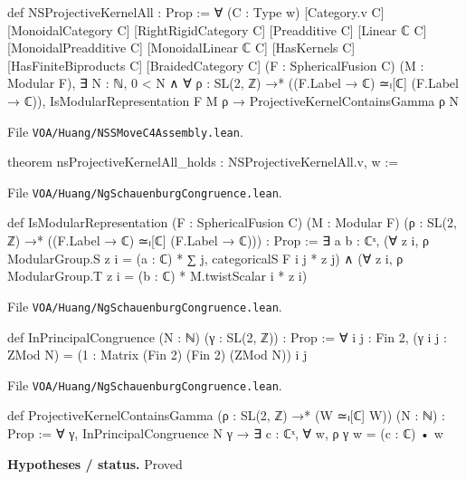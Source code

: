 \documentclass[11pt,openany]{book}
\newcommand{\leanpath}[1]{\texttt{\small #1}}
\theoremstyle{definition}
\theoremstyle{plain}
\begin{document}
\begin{leancode}
def NSProjectiveKernelAll : Prop :=
  ∀ (C : Type w) [Category.{v} C] [MonoidalCategory C] [RightRigidCategory C]
    [Preadditive C] [Linear ℂ C] [MonoidalPreadditive C] [MonoidalLinear ℂ C]
    [HasKernels C] [HasFiniteBiproducts C] [BraidedCategory C]
    (F : SphericalFusion C) (M : Modular F),
    ∃ N : ℕ, 0 < N ∧ ∀ ρ : SL(2, ℤ) →* ((F.Label → ℂ) ≃ₗ[ℂ] (F.Label → ℂ)),
      IsModularRepresentation F M ρ → ProjectiveKernelContainsGamma ρ N
\end{leancode}
{\raggedright\noindent File \leanpath{VOA/\allowbreak Huang/\allowbreak NSSMoveC4Assembly.lean}.\par}
\begin{leancode}
theorem nsProjectiveKernelAll_holds : NSProjectiveKernelAll.{v, w} :=
\end{leancode}
{\raggedright\noindent File \leanpath{VOA/\allowbreak Huang/\allowbreak NgSchauenburgCongruence.lean}.\par}
\begin{leancode}
def IsModularRepresentation (F : SphericalFusion C) (M : Modular F)
    (ρ : SL(2, ℤ) →* ((F.Label → ℂ) ≃ₗ[ℂ] (F.Label → ℂ))) : Prop :=
  ∃ a b : ℂˣ,
    (∀ z i, ρ ModularGroup.S z i = (a : ℂ) * ∑ j, categoricalS F i j * z j) ∧
    (∀ z i, ρ ModularGroup.T z i = (b : ℂ) * M.twistScalar i * z i)
\end{leancode}
{\raggedright\noindent File \leanpath{VOA/\allowbreak Huang/\allowbreak NgSchauenburgCongruence.lean}.\par}
\begin{leancode}
def InPrincipalCongruence (N : ℕ) (γ : SL(2, ℤ)) : Prop :=
  ∀ i j : Fin 2, (γ i j : ZMod N) = (1 : Matrix (Fin 2) (Fin 2) (ZMod N)) i j
\end{leancode}
{\raggedright\noindent File \leanpath{VOA/\allowbreak Huang/\allowbreak NgSchauenburgCongruence.lean}.\par}
\begin{leancode}
def ProjectiveKernelContainsGamma (ρ : SL(2, ℤ) →* (W ≃ₗ[ℂ] W)) (N : ℕ) : Prop :=
  ∀ γ, InPrincipalCongruence N γ → ∃ c : ℂˣ, ∀ w, ρ γ w = (c : ℂ) • w
\end{leancode}
\noindent\textbf{Hypotheses / status.} Proved\par
\medskip
\end{document}
